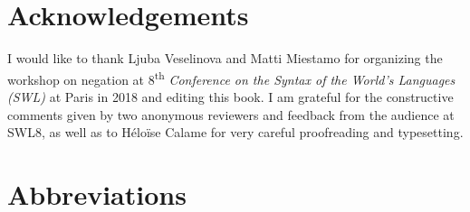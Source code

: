 \documentclass[output=paper,colorlinks=true, citecolor=brown,draftmode]{langscibook}
\begin{document}
\section*{Acknowledgements}
I would like to thank Ljuba Veselinova and Matti Miestamo for organizing the workshop on negation at 8\textsuperscript{th} {\itshape Conference on the Syntax of the World's Languages (SWL)} at Paris in 2018 and editing this book. I am grateful for the constructive comments given by two anonymous reviewers and feedback from the audience at SWL8, as well as to Héloïse Calame for very careful proofreading and typesetting.

\section*{Abbreviations}
\end{document}
